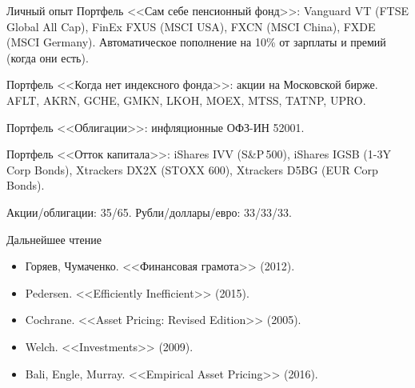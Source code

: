 \documentclass{beamer}
\begin{document}
\begin{frame}{Личный опыт}
\justify
Портфель <<Сам себе пенсионный фонд>>: Vanguard VT (FTSE Global All Cap), FinEx FXUS (MSCI USA), FXCN (MSCI China), FXDE (MSCI Germany). Автоматическое пополнение на 10\% от зарплаты и премий (когда они есть).

\justify
Портфель <<Когда нет индексного фонда>>: акции на Московской бирже. AFLT, AKRN, GCHE, GMKN, LKOH, MOEX, MTSS, TATNP, UPRO.

\justify
Портфель <<Облигации>>: инфляционные ОФЗ-ИН 52001.

\justify
Портфель <<Отток капитала>>: iShares IVV (S\&P\,500), iShares IGSB (1-3Y Corp Bonds), Xtrackers DX2X (STOXX 600), Xtrackers D5BG (EUR Corp Bonds).

\justify
Акции/облигации: 35/65. Рубли/доллары/евро: 33/33/33.
\end{frame}



\begin{frame}{Дальнейшее чтение}
\begin{itemize}
\justifying


\item Горяев, Чумаченко. <<Финансовая грамота>> (2012).
\item Pedersen. <<Efficiently Inefficient>> (2015).
\item Cochrane. <<Asset Pricing: Revised Edition>> (2005).
\item Welch. <<Investments>> (2009).
\item Bali, Engle, Murray. <<Empirical Asset Pricing>> (2016).
\end{itemize}
\end{frame}
\end{document}
